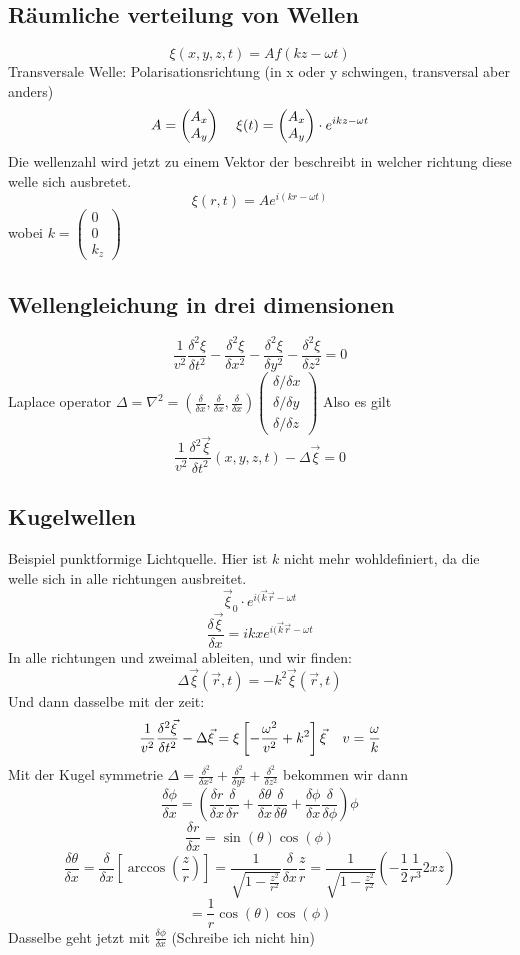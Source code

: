 \documentclass{article}
\newcommand{\mspc}{\hspace{0.4cm}}
\begin{document}
\subsection{Räumliche verteilung von Wellen}
\[\xi(x,y,z,t)=Af(kz-\omega t)\]
Transversale Welle: Polarisationsrichtung (in x oder y schwingen, transversal aber anders)
\[A=\begin{pmatrix}A_x\\A_y\end{pmatrix}\mspc \xi(t)=\begin{pmatrix}A_x\\A_y\end{pmatrix}\cdot e^{ikz-\omega t}\]
Die wellenzahl wird jetzt zu einem Vektor der beschreibt in welcher richtung diese welle sich ausbretet. 
\[\xi(r, t)=Ae^{i(kr-\omega t)}\] wobei $k=\begin{pmatrix}0\\0\\k_z\end{pmatrix}$
\subsection{Wellengleichung in drei dimensionen}
\[\frac{1}{v^2}\frac{\delta^2\xi}{\delta t^2}-\frac{\delta^2\xi}{\delta x^2}-\frac{\delta^2\xi}{\delta y^2}-\frac{\delta^2\xi}{\delta z^2}=0\]
Laplace operator $\Delta=\nabla^2=\left(\frac{\delta}{\delta x},\frac{\delta}{\delta x},\frac{\delta}{\delta x}\right)\begin{pmatrix}\delta/\delta x\\\delta/\delta y\\\delta/\delta z\end{pmatrix}$ Also es gilt \[\frac{1}{v^2}\frac{\delta^2\vec{\xi}}{\delta t^2}(x,y,z,t)-\Delta\vec{\xi}=0\]
\subsection{Kugelwellen}
Beispiel punktformige Lichtquelle. Hier ist $k$ nicht mehr wohldefiniert, da die welle sich in alle richtungen ausbreitet.
\[\vec{\xi}_0\cdot e^{i(\vec{k}\vec{r}-\omega t}\]
\[\frac{\delta \vec{\xi}}{\delta x}=ikxe^{i(\vec{k}\vec{r}- \omega t}\]
In alle richtungen und zweimal ableiten, und wir finden:
\[\Delta\vec{\xi}(\vec{r},t)=-k^2\vec{\xi}(\vec{r},t)\]
Und dann dasselbe mit der zeit:
\[\frac{1}{v^2}\frac{\delta^2\vec{\xi}}{\delta t^2}-\Delta\vec{\xi}=\xi\left[-\frac{\omega^2}{v^2}+k^2\right]\vec{\xi}\mspc v=\frac{\omega}{k}\]
Mit der Kugel symmetrie $\Delta = \frac{\delta^2}{\delta x^2}+\frac{\delta^2}{\delta y^2}+\frac{\delta^2}{\delta z^2}$
bekommen wir dann 
\[\frac{\delta \phi}{\delta x}=\left(\frac{\delta r}{\delta x}\frac{\delta}{\delta r}+\frac{\delta \theta}{\delta x}\frac{\delta}{\delta \theta}+\frac{\delta \phi}{\delta x}\frac{\delta}{\delta \phi}\right)\phi\]
\[\frac{\delta r}{\delta x}=\sin(\theta)\cos(\phi)\]
\[\frac{\delta\theta}{\delta x}=\frac{\delta}{\delta x}\left[\arccos\left(\frac{z}{r}\right)\right]=\frac{1}{\sqrt{1-\frac{z^2}{r^2}}}\frac{\delta}{\delta x}\frac{z}{r}=\frac{1}{\sqrt{1-\frac{z^2}{r^2}}}\left(-\frac{1}{2}\frac{1}{r^3}2xz\right)\]
\[=\frac{1}{r}\cos(\theta)\cos(\phi)\]
Dasselbe geht jetzt mit $\frac{\delta \phi}{\delta x}$ (Schreibe ich nicht hin)
\end{document}
